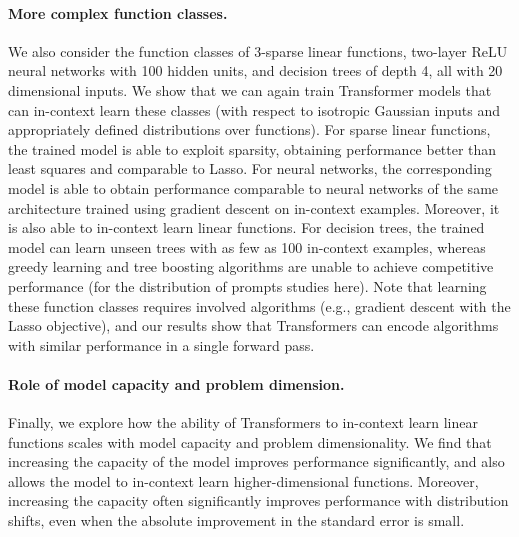 \paragraph{More complex function classes.}
We also consider the function classes of 3-sparse linear functions, two-layer ReLU neural networks with 100 hidden units, and decision trees of depth 4, all with 20 dimensional inputs.
We show that we can again train Transformer models that can in-context learn these classes (with respect to isotropic Gaussian inputs and appropriately defined distributions over functions). 
For sparse linear functions, the trained model is able to exploit sparsity, obtaining performance better than least squares and comparable to Lasso.
For neural networks, the corresponding model is able to obtain performance comparable to neural networks of the same architecture trained using gradient descent on in-context examples. Moreover, it is also able to in-context learn linear functions.
For decision trees, the trained model can learn unseen trees with as few as 100 in-context examples, whereas greedy learning and tree boosting algorithms are unable to achieve competitive performance (for the distribution of prompts studies here).
Note that learning these function classes requires involved algorithms (e.g., gradient descent with the Lasso objective), and our results show that Transformers can encode algorithms with similar performance in a single forward pass.

\paragraph{Role of model capacity and problem dimension.}
Finally, we explore how the ability of Transformers to in-context learn linear functions scales with model capacity and problem dimensionality. We find that increasing the capacity of the model improves performance significantly, and also allows the model to in-context learn higher-dimensional functions.
Moreover, increasing the capacity often significantly improves performance with distribution shifts, even when the absolute improvement in the standard error is small.